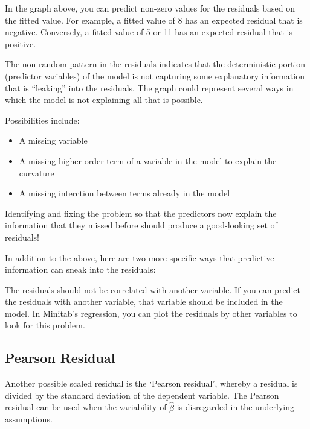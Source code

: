 
\newpage
In the graph above, you can predict non-zero values for the residuals based on the fitted value. For example, a fitted value of 8 has an expected residual that is negative. Conversely, a fitted value of 5 or 11 has an expected residual that is positive.

The non-random pattern in the residuals indicates that the deterministic portion (predictor variables) of the model is not capturing some explanatory information that is “leaking” into the residuals. The graph could represent several ways in which the model is not explaining all that is possible. 

Possibilities include:

\begin{itemize}
\item A missing variable
\item A missing higher-order term of a variable in the model to explain the curvature
\item A missing interction between terms already in the model
\end{itemize}


Identifying and fixing the problem so that the predictors now explain the information that they missed before should produce a good-looking set of residuals!

In addition to the above, here are two more specific ways that predictive information can sneak into the residuals:

The residuals should not be correlated with another variable. If you can predict the residuals with another variable, that variable should be included in the model. In Minitab’s regression, you can plot the residuals by other variables to look for this problem.




\subsection{Pearson Residual}%

Another possible scaled residual is the  `Pearson residual', whereby a residual is divided by the standard deviation of the dependent variable. The Pearson residual can be used when the variability of $\hat{\beta}$ is disregarded in the underlying assumptions.